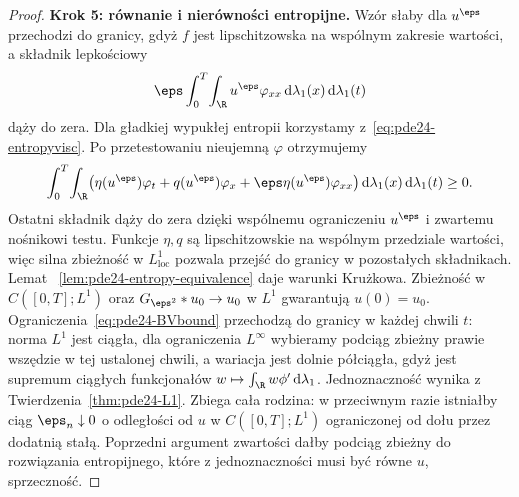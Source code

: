 \begin{proof}
\textbf{Krok 5: równanie i nierówności entropijne.}
Wzór słaby dla $u^\eps$ przechodzi do granicy, gdyż
$f$ jest lipschitzowska na wspólnym zakresie wartości,
a składnik lepkościowy
\[
 \eps\int_0^T\!\int_\R u^\eps\varphi_{xx}\,
 \mathrm d\lambda_1(x)\,\mathrm d\lambda_1(t)
\]
dąży do zera. Dla gładkiej wypukłej entropii
korzystamy z~\eqref{eq:pde24-entropyvisc}.
Po przetestowaniu nieujemną $\varphi$ otrzymujemy
\[
 \int_0^T\!\int_\R
 \bigl(\eta(u^\eps)\varphi_t+q(u^\eps)\varphi_x+
       \eps\eta(u^\eps)\varphi_{xx}\bigr)
 \,\mathrm d\lambda_1(x)\,\mathrm d\lambda_1(t)\ge0.
\]
Ostatni składnik dąży do zera dzięki wspólnemu
ograniczeniu $u^\eps$ i zwartemu nośnikowi testu.
Funkcje $\eta,q$ są lipschitzowskie na wspólnym
przedziale wartości, więc silna zbieżność w
$L^1_{\mathrm{loc}}$ pozwala przejść do granicy
w pozostałych składnikach. Lemat
~\ref{lem:pde24-entropy-equivalence} daje warunki
Krużkowa. Zbieżność w $C([0,T];L^1)$ oraz
$G_{\eps^2}*u_0\to u_0$ w $L^1$ gwarantują $u(0)=u_0$. Ograniczenia~\eqref{eq:pde24-BVbound}
przechodzą do granicy w każdej chwili $t$:
norma $L^1$ jest ciągła, dla ograniczenia $L^\infty$
wybieramy podciąg zbieżny prawie wszędzie w tej
ustalonej chwili, a wariacja jest dolnie półciągła,
gdyż jest supremum ciągłych funkcjonałów
$w\mapsto\int_\R w\phi'\,\mathrm d\lambda_1$.
Jednoznaczność wynika z Twierdzenia~\ref{thm:pde24-L1}.
Zbiega cała rodzina: w przeciwnym razie istniałby
ciąg $\eps_n\downarrow0$ o odległości od $u$
w $C([0,T];L^1)$ ograniczonej od dołu przez dodatnią
stałą. Poprzedni argument zwartości dałby podciąg
zbieżny do rozwiązania entropijnego, które z
jednoznaczności musi być równe $u$, sprzeczność.
\end{proof}


